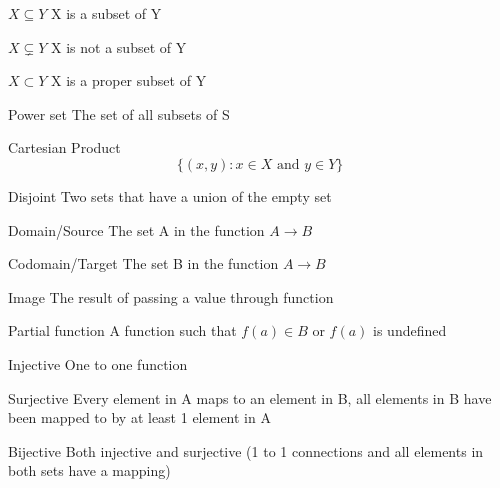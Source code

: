 \documentclass[grid,avery5371]{flashcards}
\begin{document}
\begin{flashcard}[]{$X\subseteq Y$}
	X is a subset of Y
\end{flashcard}

\begin{flashcard}[]{$X\subsetneq Y$}
	X is not a subset of Y
\end{flashcard}

\begin{flashcard}[]{$X\subset Y$}
	X is a proper subset of Y
\end{flashcard}


\begin{flashcard}[]{Power set}
	The set of all subsets of S
\end{flashcard}

\begin{flashcard}[]{Cartesian Product}
	\[
	\{(x, y) : x \in X \text { and } y \in Y\}
	\]
\end{flashcard}
\begin{flashcard}[]{Disjoint}
	Two sets that have a union of the empty set
\end{flashcard}

\begin{flashcard}[]{Domain/Source}
	The set A in the function $A\rightarrow B$
\end{flashcard}

\begin{flashcard}[]{Codomain/Target}
	The set B in the function $A\rightarrow B$
\end{flashcard}

\begin{flashcard}[]{Image}
	The result of passing a value through function
\end{flashcard}

\begin{flashcard}[]{Partial function}
	A function such that $f(a)\in B$ or $f(a)$ is undefined
\end{flashcard}


\begin{flashcard}[]{Injective}
	One to one function
\end{flashcard}

\begin{flashcard}[]{Surjective}
	Every element in A maps to an element in B, all elements in B have been mapped to by at least 1 element in A
\end{flashcard}

\begin{flashcard}[]{Bijective}
	Both injective and surjective (1 to 1 connections and all elements in both sets have a mapping)
\end{flashcard}
\end{document}
